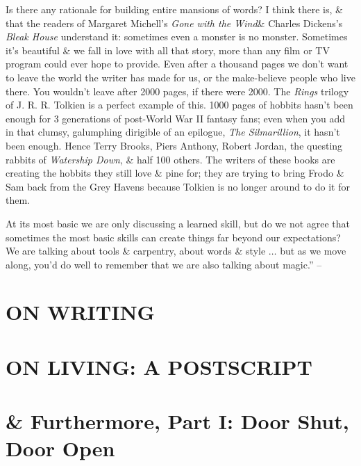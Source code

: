 \documentclass{article}
\numberwithin{equation}{section}
\begin{document}
Is there any rationale for building entire mansions of words? I think there is, \& that the readers of Margaret Michell's \textit{Gone with the Wind}\& Charles Dickens's \textit{Bleak House} understand it: sometimes even a monster is no monster. Sometimes it's beautiful \& we fall in love with all that story, more than any film or TV program could ever hope to provide. Even after a thousand pages we don't want to leave the world the writer has made for us, or the make-believe people who live there. You wouldn't leave after 2000 pages, if there were 2000. The \textit{Rings} trilogy of J. R. R. Tolkien is a perfect example of this. 1000 pages of hobbits hasn't been enough for 3 generations of post-World War II fantasy fans; even when you add in that clumsy, galumphing dirigible of an epilogue, \textit{The Silmarillion}, it hasn't been enough. Hence Terry Brooks, Piers Anthony, Robert Jordan, the questing rabbits of \textit{Watership Down}, \& half 100 others. The writers of these books are creating the hobbits they still love \& pine for; they are trying to bring Frodo \& Sam back from the Grey Havens because Tolkien is no longer around to do it for them.

At its most basic we are only discussing a learned skill, but do we not agree that sometimes the most basic skills can create things far beyond our expectations? We are talking about tools \& carpentry, about words \& style $\ldots$ but as we move along, you'd do well to remember that we are also talking about magic.'' -- \cite[pp. 86--107]{King2010}


\section{ON WRITING}


\section{ON LIVING: A POSTSCRIPT}


\section{\& Furthermore, Part I: Door Shut, Door Open}
\end{document}
